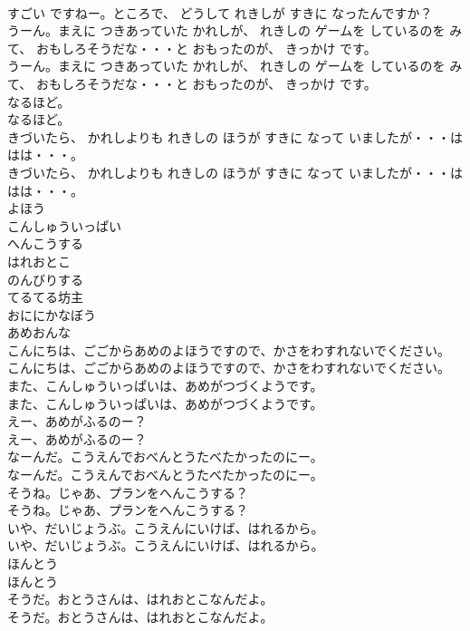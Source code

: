 \documentclass[8pt]{extreport}
\begin{document}
\begin{CJK}{UTF8}{min}
\\	すごい ですねー。ところで、 どうして れきしが すきに なったんですか？
\\	うーん。まえに つきあっていた かれしが、 れきしの ゲームを しているのを みて、 おもしろそうだな・・・と おもったのが、 きっかけ です。
\\	うーん。まえに つきあっていた かれしが、 れきしの ゲームを しているのを みて、 おもしろそうだな・・・と おもったのが、 きっかけ です。
\\	なるほど。
\\	なるほど。
\\	きづいたら、 かれしよりも れきしの ほうが すきに なって いましたが・・・ははは・・・。
\\	きづいたら、 かれしよりも れきしの ほうが すきに なって いましたが・・・ははは・・・。
\\	よほう
\\	こんしゅういっぱい
\\	へんこうする
\\	はれおとこ
\\	のんびりする
\\	てるてる坊主
\\	おににかなぼう
\\	あめおんな
\\	こんにちは、ごごからあめのよほうですので、かさをわすれないでください。
\\	こんにちは、ごごからあめのよほうですので、かさをわすれないでください。
\\	また、こんしゅういっぱいは、あめがつづくようです。
\\	また、こんしゅういっぱいは、あめがつづくようです。
\\	えー、あめがふるのー？
\\	えー、あめがふるのー？
\\	なーんだ。こうえんでおべんとうたべたかったのにー。
\\	なーんだ。こうえんでおべんとうたべたかったのにー。
\\	そうね。じゃあ、プランをへんこうする？
\\	そうね。じゃあ、プランをへんこうする？
\\	いや、だいじょうぶ。こうえんにいけば、はれるから。
\\	いや、だいじょうぶ。こうえんにいけば、はれるから。
\\	ほんとう
\\	ほんとう
\\	そうだ。おとうさんは、はれおとこなんだよ。
\\	そうだ。おとうさんは、はれおとこなんだよ。

\end{CJK}
\end{document}
